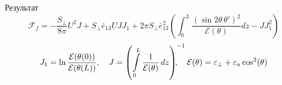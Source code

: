 \documentclass[utf8,secheader]{beamer}
\DeclareMathOperator*{\rot}{rot}
\DeclareMathOperator*{\diver}{div}
\newcommand{\FF}{\mathcal{F}}
\renewcommand{\AA}{\mathcal{A}}
\newcommand{\BB}{\mathcal{B}}
\newcommand{\CC}{\mathcal{C}}
\newcommand{\EE}{\mathcal{E}}
\renewcommand{\epsilon}{\varepsilon}
\renewcommand{\phi}{\varphi}
\begin{document}
\begin{frame}
{\begin{block}{Результат}
\begin{equation}\label{eq_F_f_final1}
\FF_{f}=-\frac{S_{\!\bot}}{8\pi}U^2 J +S_{\!\bot} \bar{e}_{13}U JJ_1+2\pi S_{\!\bot} \bar{e}_{13}^2\left(\int_{0}^{L}\frac{(\sin 2\theta \,\theta')^2}{{\EE}(\theta)}dz -JJ_1^2\right)
\end{equation}
$$
J_1=\ln{\frac{\EE(\theta(0))}{\EE(\theta(L))}},\quad J = \left( \int\limits_0^L \frac{1}{\EE(\theta)}\,dz \right)^{-1}\hspace{-0.5cm},\quad \EE(\theta) = \epsilon_\perp + \epsilon_a \cos^2(\theta)
$$
\end{block}
}
\end{frame}



%
%
%
\end{document}
